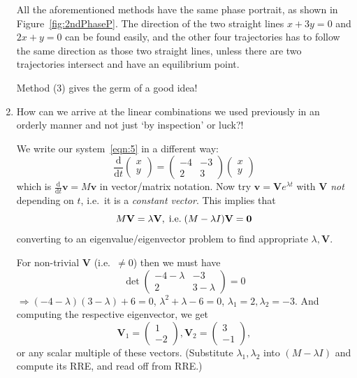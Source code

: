 \documentclass[12pt]{report}
\theoremstyle{definition}
\begin{document}
\begin{enumerate}[label = (\arabic*)]
    All the aforementioned methods have the same phase portrait, as shown in Figure~\ref{fig:2ndPhaseP}.
    The direction of the two straight lines $x + 3y = 0$ and $2x + y = 0$ can be found easily,
    and the other four trajectories has to follow the same direction as those two straight lines,
    unless there are two trajectories intersect and have an equilibrium point.

    Method (3) gives the germ of a good idea!

\item How can we arrive at the linear combinations we used previously in an orderly manner
    and not just `by inspection' or luck?!

    We write our system~\eqref{eqn:5} in a different way:
    \begin{equation}\label{eqn:6}
        \frac{\mathrm{d}}{\mathrm{d}t} \begin{pmatrix}
                x \\
                y
        \end{pmatrix} = \begin{pmatrix}
        -4 & -3 \\
        2 & 3
        \end{pmatrix} \begin{pmatrix}
                x \\
                y
        \end{pmatrix} 
    \end{equation}
      which is $\frac{\mathrm{d}}{\mathrm{d}t} \mathbf{v} = M\mathbf{v}$ in vector/matrix notation.
      Now try $\mathbf{v} = \mathbf{V}e^{\lambda t}$ with $\mathbf{V}$ \emph{not} depending on $t$,
      i.e.\ it is a \emph{constant vector}. This implies that\[
          M\mathbf{V} = \lambda \mathbf{V}, \;\textnormal{i.e.}\; (M - \lambda I)\mathbf{V} = \mathbf{0}
      \]converting to an eigenvalue/eigenvector problem to find appropriate $\lambda, \mathbf{V}$.

      For non-trivial $\mathbf{V}$ (i.e.\ $\neq 0$) then we must have\[
          \det{
          \begin{pmatrix}
              -4-\lambda & -3 \\
              2 & 3-\lambda
          \end{pmatrix} 
      } = 0
      \]
      $\Rightarrow{}(-4-\lambda)(3-\lambda)+6 = 0$, $\lambda^{2}+\lambda-6 = 0$,
      $\lambda_1 = 2, \lambda_2 = -3$.
      And computing the respective eigenvector, we get
      \[\mathbf{V}_1 = \begin{pmatrix}
              1 \\
              -2
      \end{pmatrix} , \mathbf{V}_2 = \begin{pmatrix}
              3 \\
              -1
          \end{pmatrix} ,\] or any scalar multiple of these vectors.
      (Substitute $\lambda_1, \lambda_2$ into $(M - \lambda I)$ and compute its RRE,
      and read off from RRE.)


\end{enumerate}
\end{document}
